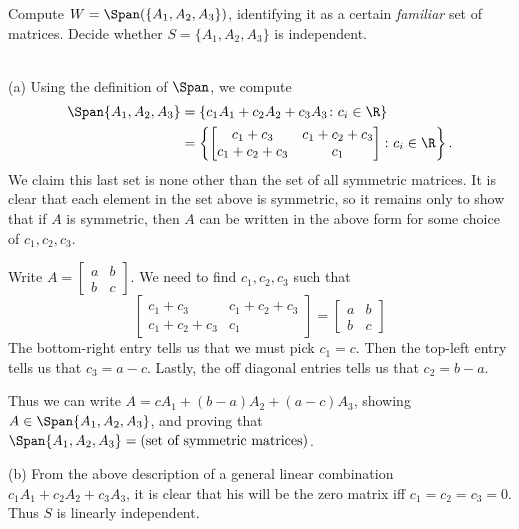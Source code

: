 \bb
\ii Compute $W=\Span(\{A_1,A_2,A_3\})$, identifying it as a certain {\em familiar} set of matrices. 
\ii Decide whether $S=\{A_1,A_2,A_3\}$ is independent. 
\ee
\begin{solution}
\ \\
(a) Using the definition of $\Span$, we compute 
\begin{align*}
\Span\{A_1,A_2,A_3\}&=\{c_1A_1+c_2A_2+c_3A_3\colon c_i\in\R\} \\
&=\left\{\begin{bmatrix} c_1+c_3&c_1+c_2+c_3\\ c_1+c_2+c_3 & c_1\end{bmatrix}\colon c_i\in\R\right\}.
\end{align*}
We claim this last set is none other than the set of all symmetric matrices. It is clear that each element in the set above is symmetric, so it remains only to show that if $A$ is symmetric, then $A$ can be written in the above form for some choice of $c_1,c_2,c_3$. 

Write $A=\begin{bmatrix}a&b\\b&c \end{bmatrix}$. We need to find $c_1,c_2,c_3$ such that 
\[
\begin{bmatrix} c_1+c_3&c_1+c_2+c_3\\ c_1+c_2+c_3 & c_1\end{bmatrix}=\begin{bmatrix}a&b\\b&c \end{bmatrix}
\]
The bottom-right entry tells us that we must pick $c_1=c$. Then the top-left entry tells us that $c_3=a-c$. Lastly, the off diagonal entries tells us that $c_2=b-a$. 

Thus we can write $A=cA_1+(b-a)A_2+(a-c)A_3$, showing $A\in\Span\{A_1,A_2,A_3\}$, and proving that $\Span\{A_1,A_2,A_3\}=(\text{set of symmetric matrices)}$. 

(b) From the above description of a general linear combination $c_1A_1+c_2A_2+c_3A_3$, it is clear that his will be the zero matrix iff $c_1=c_2=c_3=0$. Thus $S$ is linearly independent. 
\end{solution}

